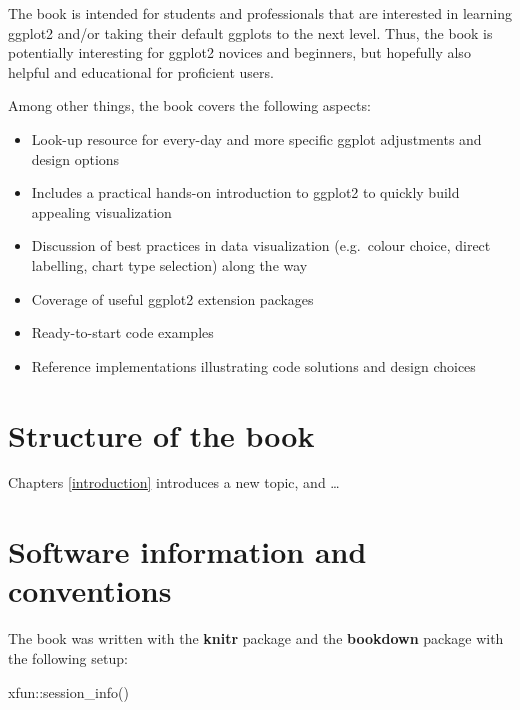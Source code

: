\documentclass[
]{krantz}
\makeatletter
\newenvironment{Shaded}{\begin{snugshade}}{\end{snugshade}}
\newcommand{\FunctionTok}[1]{\textcolor[rgb]{0,0,0}{#1}}
\newcommand{\NormalTok}[1]{#1}
\newcommand{\SpecialCharTok}[1]{\textcolor[rgb]{0,0,0}{#1}}
\providecommand{\tightlist}{%
  \setlength{\itemsep}{0pt}\setlength{\parskip}{0pt}}
\newenvironment{kframe}{%
\medskip{}
\setlength{\fboxsep}{.8em}
 \def\at@end@of@kframe{}%
 \ifinner\ifhmode%
  \def\at@end@of@kframe{\end{minipage}}%
  \begin{minipage}{\columnwidth}%
 \fi\fi%
 \def\FrameCommand##1{\hskip\@totalleftmargin \hskip-\fboxsep
 \colorbox{shadecolor}{##1}\hskip-\fboxsep
     \hskip-\linewidth \hskip-\@totalleftmargin \hskip\columnwidth}%
 \MakeFramed {\advance\hsize-\width
   \@totalleftmargin\z@ \linewidth\hsize
   \@setminipage}}%
 {\par\unskip\endMakeFramed%
 \at@end@of@kframe}
\renewenvironment{Shaded}{\begin{kframe}}{\end{kframe}}
\makeatother
\begin{document}
The book is intended for students and professionals that are interested in learning ggplot2 and/or taking their default ggplots to the next level. Thus, the book is potentially interesting for ggplot2 novices and beginners, but hopefully also helpful and educational for proficient users.

Among other things, the book covers the following aspects:

\begin{itemize}
\tightlist
\item
  Look-up resource for every-day and more specific ggplot adjustments and design options
\item
  Includes a practical hands-on introduction to ggplot2 to quickly build appealing visualization
\item
  Discussion of best practices in data visualization (e.g.~colour choice, direct labelling, chart type selection) along the way
\item
  Coverage of useful ggplot2 extension packages
\item
  Ready-to-start code examples
\item
  Reference implementations illustrating code solutions and design choices
\end{itemize}

\hypertarget{structure-of-the-book}{%
\section*{Structure of the book}\label{structure-of-the-book}}


Chapters \ref{introduction} introduces a new topic, and \ldots{}

\hypertarget{software-information-and-conventions}{%
\section*{Software information and conventions}\label{software-information-and-conventions}}


The book was written with the \textbf{knitr} package \citep{xie2015} and the \textbf{bookdown} package \citep{R-bookdown} with the following setup:

\begin{Shaded}
\begin{Highlighting}[]
\NormalTok{xfun}\SpecialCharTok{::}\FunctionTok{session\_info}\NormalTok{()}
\end{Highlighting}
\end{Shaded}
\end{document}
